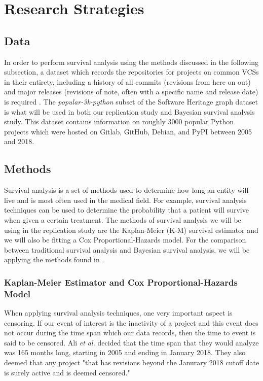 \documentclass[conference]{IEEEtran}
\begin{document}

\section{Research Strategies}

\subsection{Data}

In order to perform survival analysis using the methods discussed in the following subsection, a dataset which records the repositories for projects on common VCSs in their entirety, including a history of all commits (revisions from here on out) and major releases (revisions of note, often with a specific name and release date) is required \cite{ali2020cheating}. The \emph{popular-3k-python} subset of the Software Heritage graph dataset \cite{pietri2019software} is what will be used in both our replication study and Bayesian survival analysis study. This dataset contains information on roughly 3000 popular Python projects which were hosted on Gitlab, GitHub, Debian, and PyPI between 2005 and 2018.

\subsection{Methods}

Survival analysis is a set of methods used to determine how long an entity will live and is most often used in the medical field. For example, survival analysis techniques can be used to determine the probability that a patient will survive when given a certain treatment. The methods of survival analysis we will be using in the replication study are the Kaplan-Meier (K-M) survival estimator and we will also be fitting a Cox Proportional-Hazards model. For the comparison between traditional survival analysis and Bayesian survival analysis, we will be applying the methods found in \cite{kelter2020bayesian}. 

\subsubsection{Kaplan-Meier Estimator and Cox Proportional-Hazards Model}

When applying survival analysis techniques, one very important aspect is censoring. If our event of interest is the inactivity of a project and this event does not occur during the time span which our data records, then the time to event is said to be censored. Ali \emph{et al.} decided that the time span that they would analyze was 165 months long, starting in 2005 and ending in January 2018. They also deemed that any project "that has revisions beyond the Janurary 2018 cutoff date is surely active and is deemed censored." \cite{ali2020cheating}
\end{document}
